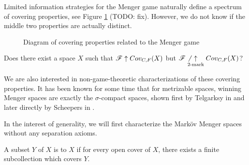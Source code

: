 Limited information strategies for the Menger game naturally define a spectrum
of covering properties, see Figure \ref{menSpec} (TODO: fix). However,
we do not know if the middle two properties are actually distinct.

\begin{figure}[h]\label{menSpec}
\begin{center}
\end{center}
\caption{Diagram of covering properties related to the Menger game}
\end{figure}

\begin{ques}\label{perfectTo2Mark}
  Does there exist a space $X$ such that $\mathscr{F} \uparrow Cov_{C,F}(X)$ but
  $\mathscr{F} \not\underset{2\text{-mark}}{\uparrow} Cov_{C,F}(X)$?
\end{ques}

We are also interested in non-game-theoretic characterizations of these
covering properties. It has been known for some time that for metrizable spaces,
winning Menger spaces are exactly the $\sigma$-compact spaces, shown first
by Telgarksy in \cite{MR753073} and later directly by Scheepers in
\cite{MR1273523}.

In the interest of generality, we will first characterize the Mark\"ov Menger
spaces without any separation axioms.

\begin{defn}
  A subset $Y$ of $X$ is  to $X$ if for every open
  cover of $X$, there exists a finite subcollection which covers $Y$.
\end{defn}

